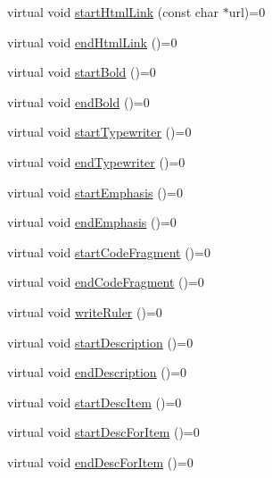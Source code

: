 \begin{DoxyCompactItemize}
\item 
virtual void \hyperlink{class_base_output_doc_interface_ab52dbf41ce337c701f9cd1e7794f80e7}{start\+Html\+Link} (const char $\ast$url)=0
\item 
virtual void \hyperlink{class_base_output_doc_interface_afb808c1c487135d4fb2156d0675b387e}{end\+Html\+Link} ()=0
\item 
virtual void \hyperlink{class_base_output_doc_interface_aa0bfe5ef08077a7191ba4666f47c441b}{start\+Bold} ()=0
\item 
virtual void \hyperlink{class_base_output_doc_interface_a2a17911ba778f8efac83999fb5d190d9}{end\+Bold} ()=0
\item 
virtual void \hyperlink{class_base_output_doc_interface_abde41a60b900d35b0b198f43731c1cd0}{start\+Typewriter} ()=0
\item 
virtual void \hyperlink{class_base_output_doc_interface_a9e987baf8aed76f0e5e6676b3238d2c8}{end\+Typewriter} ()=0
\item 
virtual void \hyperlink{class_base_output_doc_interface_a21debc3a6c4c58791a41e715dc78f4ab}{start\+Emphasis} ()=0
\item 
virtual void \hyperlink{class_base_output_doc_interface_aed2cf04d82648509f97403bd4ce62590}{end\+Emphasis} ()=0
\item 
virtual void \hyperlink{class_base_output_doc_interface_ab19fc767b08c25b0ca7c976d24799bda}{start\+Code\+Fragment} ()=0
\item 
virtual void \hyperlink{class_base_output_doc_interface_a08f032482a8f23ac1aab66552db43a81}{end\+Code\+Fragment} ()=0
\item 
virtual void \hyperlink{class_base_output_doc_interface_ade0d004fb6e8641c92f2f144d7242f0b}{write\+Ruler} ()=0
\item 
virtual void \hyperlink{class_base_output_doc_interface_ac9c801c3ad0b50e3e69be184b50c2fef}{start\+Description} ()=0
\item 
virtual void \hyperlink{class_base_output_doc_interface_ac25c565e9fd8aee6c2b0d9b71fcff380}{end\+Description} ()=0
\item 
virtual void \hyperlink{class_base_output_doc_interface_a5d1cc59d94c3f529c90e0a06704be181}{start\+Desc\+Item} ()=0
\item 
virtual void \hyperlink{class_base_output_doc_interface_a4bd0d53fa5bd37ab551b462fa1935cff}{start\+Desc\+For\+Item} ()=0
\item 
virtual void \hyperlink{class_base_output_doc_interface_a1b04c0dc473f245979860c158ea450e7}{end\+Desc\+For\+Item} ()=0
\item 

\end{DoxyCompactItemize}
